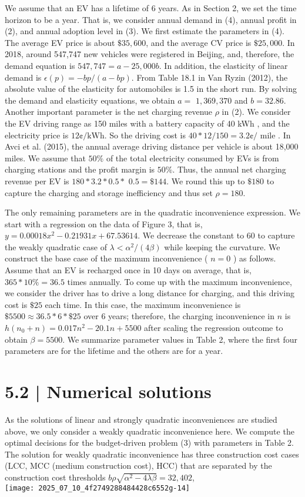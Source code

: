\documentclass[10pt]{article}
\begin{document}
We assume that an EV has a lifetime of 6 years. As in Section 2, we set the time horizon to be a year. That is, we consider annual demand in (4), annual profit in (2), and annual adoption level in (3). We first estimate the parameters in (4). The average EV price is about $\$ 35,600$, and the average CV price is $\$ 25,000$. In 2018, around 547,747 new vehicles were registered in Beijing, and, therefore, the demand equation is $547,747=a-25,000 b$. In addition, the elasticity of linear demand is $\epsilon(p)=-b p /(a-b p)$. From Table 18.1 in Van Ryzin (2012), the absolute value of the elasticity for automobiles is 1.5 in the short run. By solving the demand and elasticity equations, we obtain $a=$ $1,369,370$ and $b=32.86$. Another important parameter is the net charging revenue $\rho$ in (2). We consider the EV driving range as 150 miles with a battery capacity of 40 kWh , and the electricity price is $12 ¢ / \mathrm{kWh}$. So the driving cost is $40 * 12 / 150=3.2 ¢ /$ mile . In Avci et al. (2015), the annual average driving distance per vehicle is about 18,000 miles. We assume that $50 \%$ of the total electricity consumed by EVs is from charging stations and the profit margin is $50 \%$. Thus, the annual net charging revenue per EV is $180 * 3.2 * 0.5 *$ $0.5=\$ 144$. We round this up to $\$ 180$ to capture the charging and storage inefficiency and thus set $\rho=180$.

The only remaining parameters are in the quadratic inconvenience expression. We start with a regression on the data of Figure 3, that is, $y=0.00018 x^{2}-0.21931 x+67.53614$. We decrease the constant to 60 to capture the weakly quadratic case of $\lambda<\alpha^{2} /(4 \beta)$ while keeping the curvature. We construct the base case of the maximum inconvenience ( $n=0$ ) as follows. Assume that an EV is recharged once in 10 days on average, that is, $365 * 10 \%=36.5$ times annually. To come up with the maximum inconvenience, we consider the driver has to drive a long distance for charging, and this driving cost is $\$ 25$ each time. In this case, the maximum inconvenience is $\$ 5500 \approx 36.5 * 6 * \$ 25$ over 6 years; therefore, the charging inconvenience in $n$ is $h\left(n_{0}+n\right)=0.017 n^{2}-20.1 n+5500$ after scaling the regression outcome to obtain $\beta=5500$. We summarize parameter values in Table 2, where the first four parameters are for the lifetime and the others are for a year.

\section*{5.2 | Numerical solutions}
As the solutions of linear and strongly quadratic inconveniences are studied above, we only consider a weakly quadratic inconvenience here. We compute the optimal decisions for the budget-driven problem (3) with parameters in Table 2. The solution for weakly quadratic inconvenience has three construction cost cases (LCC, MCC (medium construction cost), HCC) that are separated by the construction cost thresholds $b \rho \sqrt{\alpha^{2}-4 \lambda \beta}=32,402$,\\
\texttt{[image: 2025\_07\_10\_4f2749288484428c6552g-14]}
\end{document}
